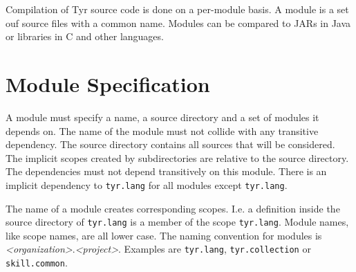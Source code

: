 Compilation of Tyr source code is done on a per-module basis.
A module is a set ouf source files with a common name.
Modules can be compared to JARs in Java or libraries in C and other languages.

\section{Module Specification}

A module must specify a name, a source directory and a set of modules it depends on.
The name of the module must not collide with any transitive dependency.
The source directory contains all sources that will be considered.
The implicit scopes created by subdirectories are relative to the source directory.
The dependencies must not depend transitively on this module.
There is an implicit dependency to \texttt{tyr.lang} for all modules except \texttt{tyr.lang}.

The name of a module creates corresponding scopes.
I.e. a definition inside the source directory of \texttt{tyr.lang} is a member of the scope \texttt{tyr.lang}.
Module names, like scope names, are all lower case.
The naming convention for modules is \textit{<organization>}.\textit{<project>}.
Examples are \texttt{tyr.lang}, \texttt{tyr.collection} or \texttt{skill.common}.